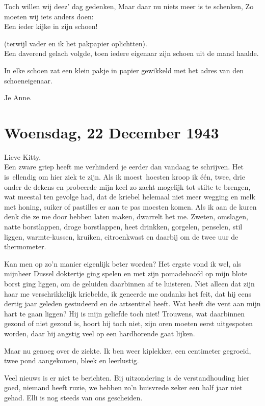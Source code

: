 \documentclass{book}
\begin{document}
Toch willen wij deez' dag gedenken, Maar daar nu niets meer is te schenken, Zo
moeten wij iets anders doen:\\
Een ieder kijke in zijn schoen!

(terwijl vader en ik het pakpapier oplichtten).\\
Een daverend gelach volgde,
toen iedere eigenaar zijn schoen uit de mand haalde.

In elke schoen zat een klein pakje in papier gewikkeld met het adres van den
schoeneigenaar.

Je Anne.

\section*{Woensdag, 22 December 1943}

Lieve Kitty,\\
Een zware griep heeft me verhinderd je eerder dan vandaag te
schrijven. Het is~ellendig om hier ziek te zijn. Als ik moest~hoesten kroop ik
één, twee, drie onder de dekens en probeerde mijn keel zo zacht mogelijk tot
stilte te brengen, wat meestal ten gevolge had, dat de kriebel helemaal niet
meer wegging en melk met honing, suiker of pastilles er aan te pas moesten
komen. Als ik aan de kuren denk die ze me door hebben laten maken, dwarrelt het
me. Zweten, omslagen, natte borstlappen, droge borstlappen, heet drinkken,
gorgelen, penselen, stil liggen, warmte-kussen, kruiken, citroenkwast en daarbij
om de twee uur de thermometer.

Kan men op zo'n manier eigenlijk beter worden? Het ergste vond ik wel, als
mijnheer Dussel doktertje ging spelen en met zijn pomadehoofd op mijn blote
borst ging liggen, om de geluiden daarbinnen af te luisteren.  Niet alleen dat
zijn haar me verschrikkelijk kriebelde, ik geneerde me ondanks het feit, dat hij
eens dertig jaar geleden gestudeerd en de artsentitel heeft. Wat heeft die vent
aan mijn hart te gaan liggen? Hij is mijn geliefde toch niet! Trouwens, wat
daarbinnen gezond of niet gezond is, hoort hij toch niet, zijn oren moeten eerst
uitgespoten worden, daar hij angstig veel op een hardhorende gaat lijken.

Maar nu genoeg over de ziekte. Ik ben weer kiplekker, een centimeter gegroeid,
twee pond aangekomen, bleek en leerlustig.

Veel nieuws is er niet te berichten. Bij uitzondering is de verstandhouding hier
goed, niemand heeft ruzie, we hebben zo'n huisvrede zeker een half jaar niet
gehad. Elli is nog steeds van ons gescheiden.
\end{document}
